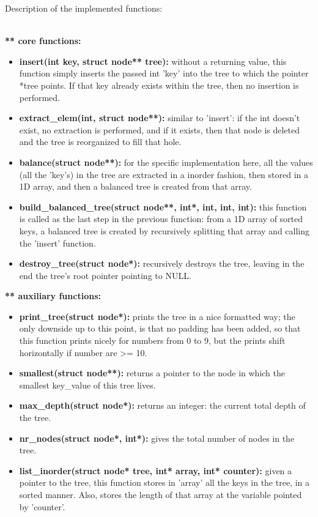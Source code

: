 \documentclass[paper=a4, fontsize=11pt]{scrartcl} %
\numberwithin{equation}{section} %
\numberwithin{figure}{section} %
\numberwithin{table}{section} %
\begin{document}
Description of the implemented functions:

\ \\

\textbf{** core functions:}

\begin{itemize}
\item \textbf{insert(int key, struct node** tree):} without a returning value, this function simply inserts the passed int 'key' into the tree to which the pointer *tree points. If that key already exists within the tree, then no insertion is performed.
\item \textbf{extract\_elem(int, struct node**):} similar to 'insert': if the int doesn't exist, no extraction is performed, and if it exists, then that node is deleted and the tree is reorganized to fill that hole.
\item \textbf{balance(struct node**):} for the specific implementation here, all the values (all the 'key's) in the tree are extracted in a inorder fashion, then stored in a 1D array, and then a balanced tree is created from that array.
\item \textbf{build\_balanced\_tree(struct node**, int*, int, int, int):} this function is called as the last step in the previous function: from a 1D array of sorted keys, a balanced tree is created by recursively splitting that array and calling the 'insert' function.
\item \textbf{destroy\_tree(struct node*):} recursively destroys the tree, leaving in the end the tree's root pointer pointing to NULL.
\end{itemize}


\textbf{** auxiliary functions:}

\begin{itemize}
\item \textbf{print\_tree(struct node*):} prints the tree in a nice formatted way; the only downside up to this point, is that no padding has been added, so that this function prints nicely for numbers from 0 to 9, but the prints shift horizontally if number are >= 10.
\item \textbf{smallest(struct node**):} returns a pointer to the node in which the smallest key\_value of this tree lives.
\item \textbf{max\_depth(struct node*):} returns an integer: the current total depth of the tree.
\item \textbf{nr\_nodes(struct node*, int*):} gives the total number of nodes in the tree.
\item \textbf{list\_inorder(struct node* tree, int* array, int* counter):} given a pointer to the tree, this function stores in 'array' all the keys in the tree, in a sorted manner. Also, stores the length of that array at the variable pointed by 'counter'.
\end{itemize}
\end{document}
